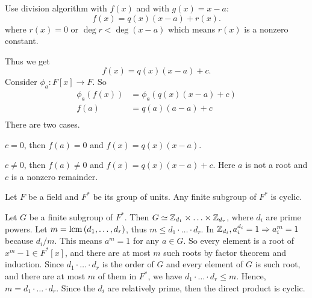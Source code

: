 \documentclass[class=article,crop=false]{standalone}
\begin{document}
\begin{prf}
	Use division algorithm with $ f(x)$ and with  $ g(x)=x-a$:
	 \[
		 f(x)=q(x)(x-a) + r(x)
	.\] 
	where $ r(x) =0$ or  $ \deg r< \deg (x-a)$ which means $ r(x)$ is a nonzero constant.

	Thus we get
	 \[
		 f(x) = q(x)(x-a)+c
	.\] 
	Consider $ \phi_{a}: F[x] \to F$. So
	\begin{align*}
		\phi_a(f(x))& = \phi_a (q(x)(x-a)+c)\\
		f(a)&= q(a)(a-a) + c \\
	\end{align*}
	There are two cases.
	\begin{case}[]
		$ c=0$, then  $ f(a)=0$ and  $ f(x) = q(x)(x-a)$.
	\end{case}
	\begin{case}[]
		$ c\neq 0$, then  $ f(a) \neq 0$ and  $ f(x)= q(x)(x-a) + c$. Here  $ a$ is not a root and  $ c$ is a nonzero remainder.
	\end{case}
\end{prf}

\begin{coro}[23.6]
	Let $ F$  be a field and $ F^* $ be its group of units. Any finite subgroup of $ F^* $ is cyclic. 
\end{coro}
\begin{prf}[]
	Let $ G$ be a finite subgroup of  $ F^* $. Then $ G \simeq \mathbb{Z}_{d_1} \times \ldots\times \mathbb{Z}_{d_r}$, where $ d_i$ are prime powers. Let $ m= \operatorname{lcm} \left( d_1,\ldots,d_r \right)  $, thus $ m\leq d_1 \cdot  \ldots \cdot d_r$. In $ \mathbb{Z}_{d_i}, a_i^{d_i} = 1 \Rightarrow a_i^{m} = 1$ because $ d_i /m$. This means $ a^{m} =1$ for any $ a \in G$. So every element is a root of $ x^{m}-1 \in F^*[x]$, and there are at most $ m$ such roots by factor theorem and induction. Since $ d_1 \cdot  \ldots \cdot d_r$ is the order of $ G$ and every element of  $ G$ is such root, and there are at most  $ m$ of them in  $ F^*$, we have $ d_1 \cdot \ldots \cdot  d_r \leq m$. Hence, $ m = d_1 \cdot  \ldots \cdot  d_r$. Since the $ d_i$ are relatively prime, then the direct product is cyclic.
\end{prf}
\end{document}

